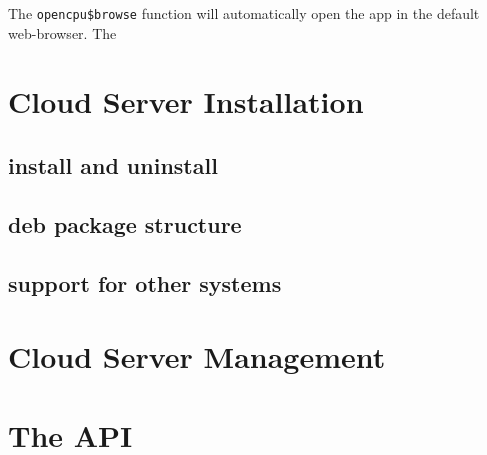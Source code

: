 \documentclass{scrartcl}\usepackage[]{graphicx}\usepackage[]{color}
\begin{document}
\noindent The \texttt{opencpu\$browse} function will automatically open the app in the default web-browser. The 



\section{Cloud Server Installation}

\subsection{install and uninstall}

\subsection{deb package structure}

\subsection{support for other systems}


\section{Cloud Server Management}





\section{The API}
\end{document}

